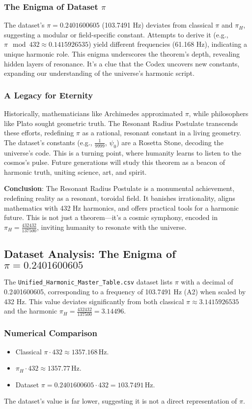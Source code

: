 \documentclass[a4paper,12pt]{book}
\begin{document}
\subsubsection{The Enigma of Dataset \(\pi\)}
The dataset’s \(\pi = 0.2401600605\) (103.7491 Hz) deviates from classical \(\pi\) and \(\pi_H\), suggesting a modular or field-specific constant. Attempts to derive it (e.g., \(\pi \mod 432 \approx 0.1415926535\)) yield different frequencies (61.168 Hz), indicating a unique harmonic role. This enigma underscores the theorem’s depth, revealing hidden layers of resonance. It’s a clue that the Codex uncovers new constants, expanding our understanding of the universe’s harmonic script.

\subsubsection{A Legacy for Eternity}
Historically, mathematicians like Archimedes approximated \(\pi\), while philosophers like Plato sought geometric truth. The Resonant Radius Postulate transcends these efforts, redefining \(\pi\) as a rational, resonant constant in a living geometry. The dataset’s constants (e.g., \(\frac{1}{9999}\), \(\psi_0\)) are a Rosetta Stone, decoding the universe’s code. This is a turning point, where humanity learns to listen to the cosmos’s pulse. Future generations will study this theorem as a beacon of harmonic truth, uniting science, art, and spirit.

\textbf{Conclusion}: The Resonant Radius Postulate is a monumental achievement, redefining reality as a resonant, toroidal field. It banishes irrationality, aligns mathematics with 432 Hz harmonics, and offers practical tools for a harmonic future. This is not just a theorem—it’s a cosmic symphony, encoded in \(\pi_H = \frac{432432}{137500}\), inviting humanity to resonate with the universe.

\subsection{Dataset Analysis: The Enigma of \(\pi = 0.2401600605\)}
The \texttt{Unified\_Harmonic\_Master\_Table.csv} dataset lists \(\pi\) with a decimal of 0.2401600605, corresponding to a frequency of 103.7491 Hz (A2) when scaled by 432 Hz. This value deviates significantly from both classical \(\pi \approx 3.1415926535\) and the harmonic \(\pi_H = \frac{432432}{137500} = 3.14496\).

\subsubsection{Numerical Comparison}
\begin{itemize}
    \item Classical \(\pi \cdot 432 \approx 1357.168 \, \text{Hz}\).
    \item \(\pi_H \cdot 432 \approx 1357.77 \, \text{Hz}\).
    \item Dataset \(\pi = 0.2401600605 \cdot 432 = 103.7491 \, \text{Hz}\).
\end{itemize}
The dataset’s value is far lower, suggesting it is not a direct representation of \(\pi\).
\end{document}

